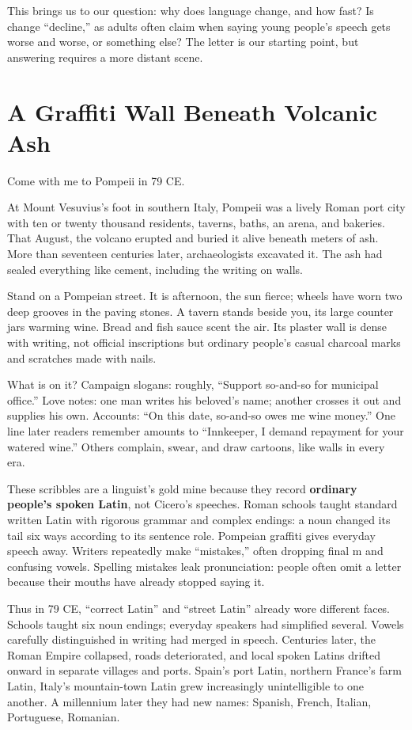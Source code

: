 This brings us to our question: why does language change, and how fast? Is change ``decline,'' as adults often claim when saying young people's speech gets worse and worse, or something else? The letter is our starting point, but answering requires a more distant scene.

\section{A Graffiti Wall Beneath Volcanic Ash}
Come with me to Pompeii in 79 CE.

At Mount Vesuvius's foot in southern Italy, Pompeii was a lively Roman port city with ten or twenty thousand residents, taverns, baths, an arena, and bakeries. That August, the volcano erupted and buried it alive beneath meters of ash. More than seventeen centuries later, archaeologists excavated it. The ash had sealed everything like cement, including the writing on walls.

Stand on a Pompeian street. It is afternoon, the sun fierce; wheels have worn two deep grooves in the paving stones. A tavern stands beside you, its large counter jars warming wine. Bread and fish sauce scent the air. Its plaster wall is dense with writing, not official inscriptions but ordinary people's casual charcoal marks and scratches made with nails.

What is on it? Campaign slogans: roughly, ``Support so-and-so for municipal office.'' Love notes: one man writes his beloved's name; another crosses it out and supplies his own. Accounts: ``On this date, so-and-so owes me wine money.'' One line later readers remember amounts to ``Innkeeper, I demand repayment for your watered wine.'' Others complain, swear, and draw cartoons, like walls in every era.

These scribbles are a linguist's gold mine because they record \textbf{ordinary people's spoken Latin}, not Cicero's speeches. Roman schools taught standard written Latin with rigorous grammar and complex endings: a noun changed its tail six ways according to its sentence role. Pompeian graffiti gives everyday speech away. Writers repeatedly make ``mistakes,'' often dropping final m and confusing vowels. Spelling mistakes leak pronunciation: people often omit a letter because their mouths have already stopped saying it.

Thus in 79 CE, ``correct Latin'' and ``street Latin'' already wore different faces. Schools taught six noun endings; everyday speakers had simplified several. Vowels carefully distinguished in writing had merged in speech. Centuries later, the Roman Empire collapsed, roads deteriorated, and local spoken Latins drifted onward in separate villages and ports. Spain's port Latin, northern France's farm Latin, Italy's mountain-town Latin grew increasingly unintelligible to one another. A millennium later they had new names: Spanish, French, Italian, Portuguese, Romanian.

